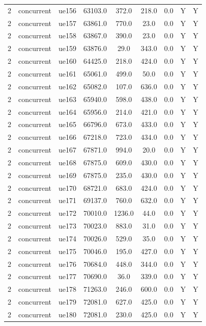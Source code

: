 \begin{table}[ht]
\begin{tabular}{|c|c|c|c|c|c|c|c|c|}
2 & concurrent & ue156 & 63103.0 & 372.0 & 218.0 & 0.0 & Y & Y \\
2 & concurrent & ue157 & 63861.0 & 770.0 & 23.0 & 0.0 & Y & Y \\
2 & concurrent & ue158 & 63867.0 & 390.0 & 23.0 & 0.0 & Y & Y \\
2 & concurrent & ue159 & 63876.0 & 29.0 & 343.0 & 0.0 & Y & Y \\
2 & concurrent & ue160 & 64425.0 & 218.0 & 424.0 & 0.0 & Y & Y \\
2 & concurrent & ue161 & 65061.0 & 499.0 & 50.0 & 0.0 & Y & Y \\
2 & concurrent & ue162 & 65082.0 & 107.0 & 636.0 & 0.0 & Y & Y \\
2 & concurrent & ue163 & 65940.0 & 598.0 & 438.0 & 0.0 & Y & Y \\
2 & concurrent & ue164 & 65956.0 & 214.0 & 421.0 & 0.0 & Y & Y \\
2 & concurrent & ue165 & 66796.0 & 673.0 & 433.0 & 0.0 & Y & Y \\
2 & concurrent & ue166 & 67218.0 & 723.0 & 434.0 & 0.0 & Y & Y \\
2 & concurrent & ue167 & 67871.0 & 994.0 & 20.0 & 0.0 & Y & Y \\
2 & concurrent & ue168 & 67875.0 & 609.0 & 430.0 & 0.0 & Y & Y \\
2 & concurrent & ue169 & 67875.0 & 235.0 & 430.0 & 0.0 & Y & Y \\
2 & concurrent & ue170 & 68721.0 & 683.0 & 424.0 & 0.0 & Y & Y \\
2 & concurrent & ue171 & 69137.0 & 760.0 & 632.0 & 0.0 & Y & Y \\
2 & concurrent & ue172 & 70010.0 & 1236.0 & 44.0 & 0.0 & Y & Y \\
2 & concurrent & ue173 & 70023.0 & 883.0 & 31.0 & 0.0 & Y & Y \\
2 & concurrent & ue174 & 70026.0 & 529.0 & 35.0 & 0.0 & Y & Y \\
2 & concurrent & ue175 & 70046.0 & 195.0 & 427.0 & 0.0 & Y & Y \\
2 & concurrent & ue176 & 70684.0 & 448.0 & 344.0 & 0.0 & Y & Y \\
2 & concurrent & ue177 & 70690.0 & 36.0 & 339.0 & 0.0 & Y & Y \\
2 & concurrent & ue178 & 71263.0 & 246.0 & 600.0 & 0.0 & Y & Y \\
2 & concurrent & ue179 & 72081.0 & 627.0 & 425.0 & 0.0 & Y & Y \\
2 & concurrent & ue180 & 72081.0 & 230.0 & 425.0 & 0.0 & Y & Y \\

\end{tabular}
\end{table}
